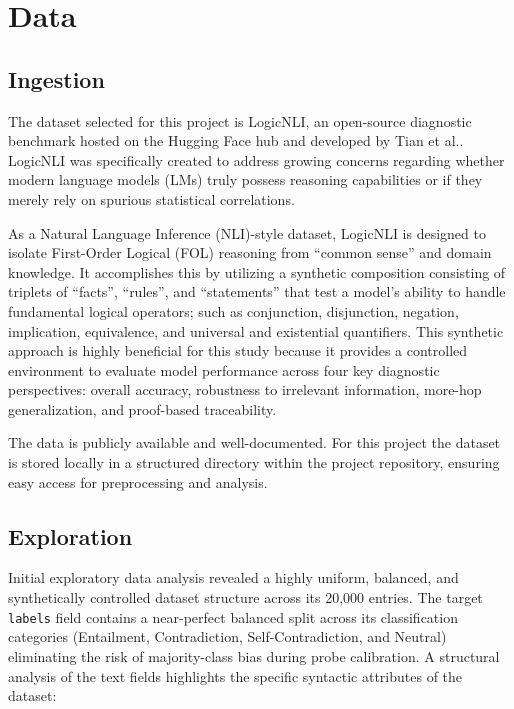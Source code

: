 \documentclass[12 pt]{article}  %
\begin{document}
\newpage
\section{Data}

\subsection{Ingestion}
The dataset selected for this project is LogicNLI, an open-source diagnostic 
benchmark hosted on the Hugging Face hub and developed by Tian et al.. LogicNLI 
was specifically created to address growing concerns regarding whether modern 
language models (LMs) truly possess reasoning capabilities or if they merely 
rely on spurious statistical correlations.

As a Natural Language Inference (NLI)-style dataset, LogicNLI is designed to 
isolate First-Order Logical (FOL) reasoning from ``common sense'' and domain 
knowledge. It accomplishes this by utilizing a synthetic composition consisting 
of triplets of ``facts'', ``rules'', and ``statements'' that test a model's 
ability to handle fundamental logical operators; such as conjunction, disjunction, 
negation, implication, equivalence, and universal and existential quantifiers. 
This synthetic approach is highly beneficial for this study because it provides 
a controlled environment to evaluate model performance across four key 
diagnostic perspectives: overall accuracy, robustness to irrelevant information, 
more-hop generalization, and proof-based traceability\cite{tian-etal-2021-diagnosing}.

The data is publicly available and well-documented. For this project the dataset 
is stored locally in a structured directory within the project repository, 
ensuring easy access for preprocessing and analysis.

\subsection{Exploration}
Initial exploratory data analysis revealed a highly uniform, balanced, and 
synthetically controlled dataset structure across its 20,000 entries.
The target \texttt{labels} field contains a near-perfect balanced split across 
its classification categories (Entailment, Contradiction, Self-Contradiction, 
and Neutral) eliminating the risk of majority-class bias during probe 
calibration. A structural analysis of the text fields highlights the specific 
syntactic attributes of the dataset:
\end{document}
